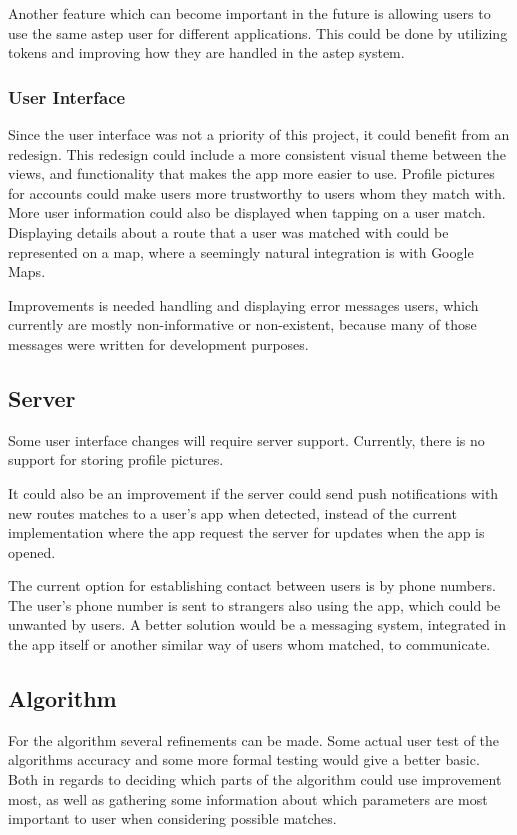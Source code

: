 Another feature which can become important in the future is allowing users to use the same \gls{astep} user for different applications.
This could be done by utilizing tokens and improving how they are handled in the \gls{astep} system.

\subsubsection*{User Interface}
Since the user interface was not a priority of this project, it could benefit from an redesign.
This redesign could include a more consistent visual theme between the views, and functionality that makes the app more easier to use.
Profile pictures for accounts could make  users more trustworthy to users whom they match with.
More user information could also be displayed when tapping on a user match.
Displaying details about a route that a user was matched with could be represented on a map, where a seemingly natural integration is with Google Maps.

Improvements is needed handling and displaying error messages users, which currently are mostly non-informative or non-existent, because many of those messages were written for development purposes.

\subsection{Server}
Some user interface changes will require server support.
Currently, there is no support for storing profile pictures.

It could also be an improvement if the server could send push notifications with new routes matches to a user's app when detected, instead of the current implementation where the app request the server for updates when the app is opened.

The current option for establishing contact between users is by phone numbers.
The user's phone number is sent to strangers also using the app, which could be unwanted by users.
A better solution would be a messaging system, integrated in the app itself or another similar way of users whom matched, to communicate.

\subsection{Algorithm}
For the algorithm several refinements can be made.
Some actual user test of the algorithms accuracy and some more formal testing would give a better basic.
Both in regards to deciding which parts of the algorithm could use improvement most, as well as gathering some information about which parameters are most important to user when considering possible matches.

